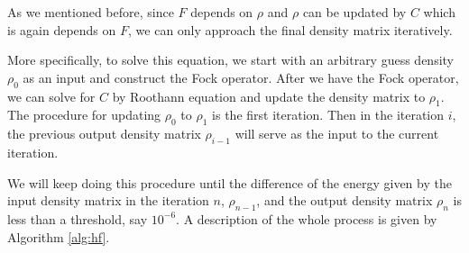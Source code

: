 \documentclass[twoside,11pt]{article}
\begin{document}









As we mentioned before, since $F$ depends on $\rho$ and $\rho$ can be updated by $C$ which is again depends on $F$, we can only approach the final density matrix iteratively.

More specifically, to solve this equation, we start with an arbitrary guess density $\rho_0$ as an input and construct the Fock operator. 
After we have the Fock operator, we can solve for $C$ by Roothann equation and update the density matrix to $\rho_1$. The procedure for updating $\rho_0$ to $\rho_1$ is the first iteration. Then in the iteration $i$, the previous output density matrix $\rho_{i-1}$ will serve as the input to the current iteration.

We will keep doing this procedure until the difference of the energy given by the input density matrix in the iteration $n$, $\rho_{n-1}$,  and the output density matrix $\rho_n$ is less than a threshold, say $10^{-6}$.  A description of the whole process is given by Algorithm \ref{alg:hf}.

\end{document}

